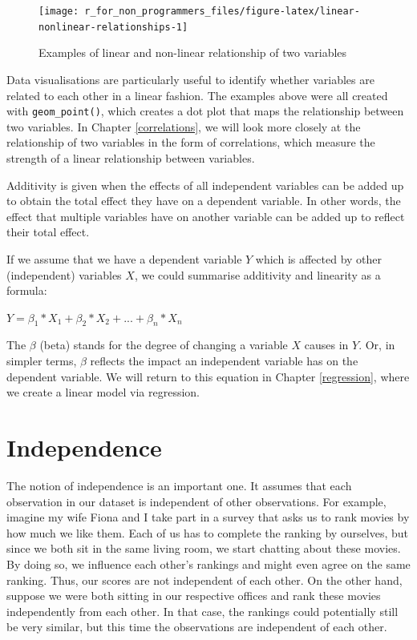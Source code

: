 \documentclass[
]{book}
\begin{document}
\begin{figure}

{\centering \texttt{[image: r\_for\_non\_programmers\_files/figure-latex/linear-nonlinear-relationships-1]} 

}

\caption{Examples of linear and non-linear relationship of two variables}\label{fig:linear-nonlinear-relationships}
\end{figure}

Data visualisations are particularly useful to identify whether variables are related to each other in a linear fashion. The examples above were all created with \texttt{geom\_point()}, which creates a dot plot that maps the relationship between two variables. In Chapter \ref{correlations}, we will look more closely at the relationship of two variables in the form of correlations, which measure the strength of a linear relationship between variables.

Additivity is given when the effects of all independent variables can be added up to obtain the total effect they have on a dependent variable. In other words, the effect that multiple variables have on another variable can be added up to reflect their total effect.

If we assume that we have a dependent variable \(Y\) which is affected by other (independent) variables \(X\), we could summarise additivity and linearity as a formula:

\leavevmode\hypertarget{linearity_additivity-formula}{}%
\(Y = \beta_{1} * X_1 + \beta_{2} * X_{2} + ... + \beta_{n} * X_{n}\)

The \(\beta\) (beta) stands for the degree of changing a variable \(X\) causes in \(Y\). Or, in simpler terms, \(\beta\) reflects the impact an independent variable has on the dependent variable. We will return to this equation in Chapter \ref{regression}, where we create a linear model via regression.

\hypertarget{independence}{%
\section{Independence}\label{independence}}

The notion of independence is an important one. It assumes that each observation in our dataset is independent of other observations. For example, imagine my wife Fiona and I take part in a survey that asks us to rank movies by how much we like them. Each of us has to complete the ranking by ourselves, but since we both sit in the same living room, we start chatting about these movies. By doing so, we influence each other's rankings and might even agree on the same ranking. Thus, our scores are not independent of each other. On the other hand, suppose we were both sitting in our respective offices and rank these movies independently from each other. In that case, the rankings could potentially still be very similar, but this time the observations are independent of each other.
\end{document}
